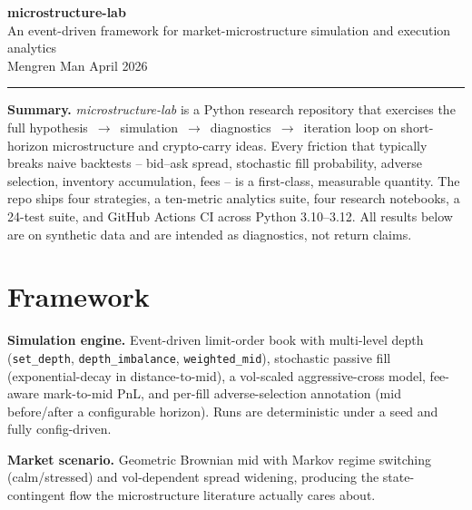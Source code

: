 \documentclass[10pt, a4paper]{article}
\newcommand{\code}[1]{\texttt{\small #1}}
\begin{document}
\begin{center}
  {\Large\bfseries\color{mblue} microstructure-lab}\\[1pt]
  {\small An event-driven framework for market-microstructure simulation and execution analytics}\\[2pt]
  {\footnotesize\color{mgray} Mengren Man \enspace\textbullet\enspace April 2026}
\end{center}
\vspace{-6pt}
{\color{ruleblue}\rule{\linewidth}{0.5pt}}

\vspace{2pt}
\noindent\textbf{Summary.}\enspace
\textit{microstructure-lab} is a Python research repository that exercises the full hypothesis~$\rightarrow$~simulation~$\rightarrow$~diagnostics~$\rightarrow$~iteration loop on short-horizon microstructure and crypto-carry ideas. Every friction that typically breaks naive backtests -- bid--ask spread, stochastic fill probability, adverse selection, inventory accumulation, fees -- is a first-class, measurable quantity. The repo ships four strategies, a ten-metric analytics suite, four research notebooks, a 24-test suite, and GitHub Actions CI across Python 3.10--3.12. All results below are on synthetic data and are intended as diagnostics, not return claims.

\section{Framework}

\textbf{Simulation engine.} Event-driven limit-order book with multi-level depth (\code{set\_depth}, \code{depth\_imbalance}, \code{weighted\_mid}), stochastic passive fill (exponential-decay in distance-to-mid), a vol-scaled aggressive-cross model, fee-aware mark-to-mid PnL, and per-fill adverse-selection annotation (mid before/after a configurable horizon). Runs are deterministic under a seed and fully config-driven.

\textbf{Market scenario.} Geometric Brownian mid with Markov regime switching (calm/stressed) and vol-dependent spread widening, producing the state-contingent flow the microstructure literature actually cares about.
\end{document}
